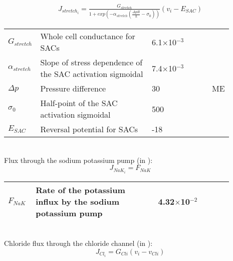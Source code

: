 \begin{equation} \label{eq:Jstretchi}
\begin{split}
J_{stretch_{i}}= \frac{G_{stretch}}{1+ exp\left(-\alpha_{stretch}  \left(  \frac{\Delta pR}{h} -\sigma_{0}   \right) \right)}  \left(  v_{i}-E_{SAC}   \right) 
\end{split}
\end{equation}
%
\begin{table}[h!]
\centering
\begin{tabular}{ p{0.09\linewidth}  >{\footnotesize} p{0.5\linewidth}  >{\footnotesize} p{0.27\linewidth} >{\footnotesize} p{0.03\linewidth} }
\hline
$G_{stretch}$      		& Whole cell conductance for SACs						& 6.1$\times$10$^{-3}$ \uMpmVs	&\cite{Koenigsberger2006} \\
$\alpha_{stretch}$      & Slope of stress dependence of the SAC activation sigmoidal	& 7.4$\times$10$^{-3}$ \pmmHg	&\cite{Koenigsberger2006} \\
$ \Delta p $			& Pressure difference										& 30 \mmHg			& ME \\
$\sigma_{0}$      		& Half-point of the SAC activation sigmoidal				& 500 \mmHg			&\cite{Koenigsberger2006} \\
$E_{SAC}$      			& Reversal potential for SACs							& -18 \mV			&\cite{Koenigsberger2006} \\
\hline
\end{tabular}
\label{tab:Jstretchi}
\end{table}
\\
%
Flux through the sodium potassium pump (in \uMs): 
\begin{equation} \label{eq:J_NaK_i}
J_{NaK_{i}}= F_{NaK}
\end{equation}
%
\begin{table}[h!]
\centering
\begin{tabular}{ p{0.09\linewidth}  >{\footnotesize} p{0.5\linewidth}  >{\footnotesize} p{0.27\linewidth} >{\footnotesize} p{0.03\linewidth} }
\hline
$F_{NaK}$      			& Rate of the potassium influx by the sodium potassium pump 		& 4.32$\times$10$^{-2}$ \uMps 	&\cite{Koenigsberger2006} \\
\hline
\end{tabular}
\label{tab:JCli}
\end{table}
\\
Chloride flux through the chloride channel (in \uMs):
\begin{equation} \label{eq:JCli}
J_{Cl_{i}} = G_{Cli} \left(  v_{i} - v_{Cli}  \right) 
\end{equation}
